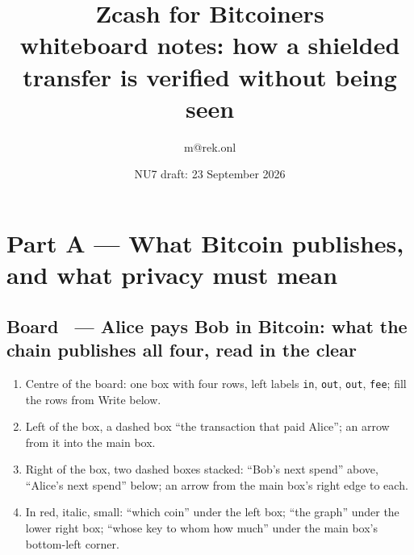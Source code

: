 \documentclass[11pt,a4paper]{article}
\title{Zcash for Bitcoiners\\\large whiteboard notes: how a shielded transfer is verified without being seen}
\author{m@rek.onl}
\date{NU7 draft: 23 September 2026}
\makeatletter
\newcounter{board}
\newenvironment{board}[2]{\stepcounter{board}%
  \subsection*{Board \theboard\ --- #1 \hfill {\normalfont\small\color{arb}#2}}}{\medskip}
\newcommand{\Draw}{\draw@head{Draw}}
\makeatother
\begin{document}
\maketitle
\tableofcontents


\section{Part A --- What Bitcoin publishes, and what privacy must mean}

\begin{board}{Alice pays Bob in Bitcoin: what the chain publishes}%
  {all four, read in the clear}
\Draw
\begin{enumerate}
  \item Centre of the board: one box with four rows, left labels
    \texttt{in}, \texttt{out}, \texttt{out}, \texttt{fee}; fill the rows
    from Write below.
  \item Left of the box, a dashed box ``the transaction that paid Alice'';
    an arrow from it into the main box.
  \item Right of the box, two dashed boxes stacked: ``Bob's next spend''
    above, ``Alice's next spend'' below; an arrow from the main box's
    right edge to each.
  \item In red, italic, small: ``which coin'' under the left box; ``the
    graph'' under the lower right box; ``whose key \quad to whom \quad
    how much'' under the main box's bottom-left corner.
\end{enumerate}
\begin{center}
\end{center}
\end{board}
\end{document}
